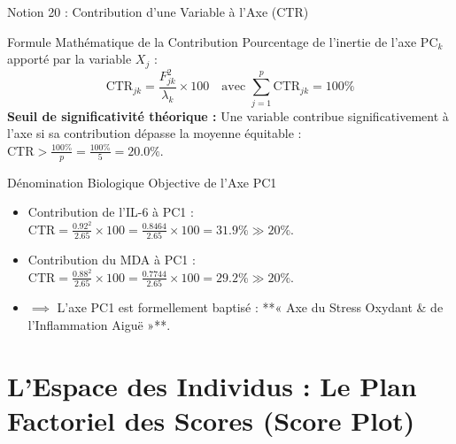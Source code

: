 \documentclass[aspectratio=169,10pt]{beamer}
\begin{document}
\begin{frame}{Notion 20 : Contribution d'une Variable à l'Axe ($\text{CTR}$)}
  \begin{conceptbox}{Formule Mathématique de la Contribution}
    \footnotesize
    Pourcentage de l'inertie de l'axe $\text{PC}_k$ apporté par la variable $X_j$ :
    \begin{equation*}
      \text{CTR}_{jk} = \frac{F_{jk}^2}{\lambda_k} \times 100 \quad \text{avec } \sum_{j=1}^p \text{CTR}_{jk} = 100\%
    \end{equation*}
    \textbf{Seuil de significativité théorique :} Une variable contribue significativement à l'axe si sa contribution dépasse la moyenne équitable : $\text{CTR} > \frac{100\%}{p} = \frac{100\%}{5} = \mathbf{20.0\%}$.
  \end{conceptbox}
  \vspace{1mm}
  \begin{biobox}{Dénomination Biologique Objective de l'Axe PC1}
    \footnotesize
    \begin{itemize}
      \item Contribution de l'IL-6 à PC1 : $\text{CTR} = \frac{0.92^2}{2.65} \times 100 = \frac{0.8464}{2.65} \times 100 = \mathbf{31.9\%} \gg 20\%$.
      \item Contribution du MDA à PC1 : $\text{CTR} = \frac{0.88^2}{2.65} \times 100 = \frac{0.7744}{2.65} \times 100 = \mathbf{29.2\%} \gg 20\%$.
      \item $\implies$ L'axe PC1 est formellement baptisé : **« Axe du Stress Oxydant \& de l'Inflammation Aiguë »**.
    \end{itemize}
  \end{biobox}
\end{frame}

\section{L'Espace des Individus : Le Plan Factoriel des Scores (Score Plot)}
\end{document}
